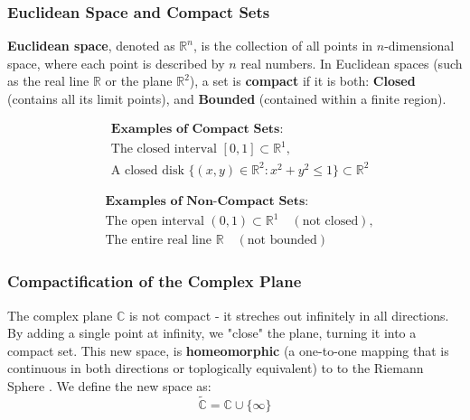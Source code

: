 \documentclass[a4paper, 10pt]{article}
\begin{document}
\subsubsection{Euclidean Space and Compact Sets}
\textbf{Euclidean space}, denoted as \(\mathbb{R}^n\), is the collection of all points in \(n\)-dimensional space, where each point is described by \(n\) real numbers. In Euclidean spaces (such as the real line \(\mathbb{R}\) or the plane \(\mathbb{R}^2\)), a set is \textbf{compact} if it is both: \textbf{Closed} (contains all its limit points), and \textbf{Bounded} (contained within a finite region).

\begin{minipage}{0.47\textwidth}
  \begin{align*}
     & \textbf{Examples of Compact Sets:}                                                       \\
     & \text{The closed interval } [0,1] \subset \mathbb{R}^1,                                  \\
     & \text{A closed disk } \{(x,y) \in \mathbb{R}^2 : x^2 + y^2 \leq 1\} \subset \mathbb{R}^2
  \end{align*}
\end{minipage}\hfill
\begin{minipage}{0.47\textwidth}
  \begin{align*}
     & \textbf{Examples of Non-Compact Sets:}                                          \\
     & \text{The open interval } (0,1) \subset \mathbb{R}^1 \quad (\text{not closed}), \\
     & \text{The entire real line } \mathbb{R} \quad (\text{not bounded})
  \end{align*}
\end{minipage}

\subsubsection{Compactification of the Complex Plane}
The complex plane $\mathbb{C}$ is not compact - it streches out infinitely in all directions.
By adding a single point at infinity, we "close" the plane, turning it into a compact set.
This new space, is \textbf{homeomorphic} (a one-to-one mapping that is continuous
in both directions or toplogically equivalent) to  to the Riemann Sphere . We define the new space as:
$$\tilde{\mathbb{C}} = \mathbb{C} \cup \{\infty\}$$
\end{document}
